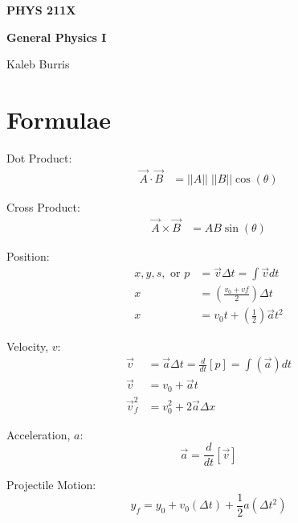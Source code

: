 \documentclass[10pt, letterpaper]{book}
\begin{document}
    \begin{titlepage}
        \Huge \textbf{PHYS 211X}

        \huge \textbf{General Physics I}

        \vfill

        \Large Kaleb Burris
    \end{titlepage}

    \section*{Formulae}

    \begin{multicols*}{2}

        Dot Product:
        \begin{align}
            \vec{A}\cdot\vec{B} & = ||A|| \; ||B||\cos(\theta)
        \end{align}

        Cross Product:
        \begin{align}
            \vec{A}\times\vec{B} & = AB\sin(\theta)
        \end{align}

        Position:
        \begin{align}
            x, y, s, \text{ or } p  & = \vec{v}\Delta t = \int\vec{v}dt                     \\
                                 x  & = \left(\frac{v_{0}+v{f}}{2}\right)\Delta t           \\
                                 x  & = v_{0} t+\left(\frac{1}{2}\right)\vec{a} t^{2}       
        \end{align}

        Velocity, $v$:
        \begin{align}
            \vec{v}         & = \vec{a}\Delta t = \frac{d}{dt}[p] = \int(\vec{a})dt     \\
            \vec{v}         & = v_{0} + \vec{a}t                                        \\
            \vec{v}^{2}_{f} & = v^{2}_{0} + 2\vec{a}\Delta x                            
        \end{align}

        Acceleration, $a$:
        \begin{equation}
            \vec{a} = \frac{d}{dt}[\vec{v}]
        \end{equation}

        Projectile Motion:
        \begin{equation}
            \label{eqn::yfinal}
            y_{f} = y_{0} + v_{0}(\Delta t) + \frac{1}{2}a(\Delta t^{2})
        \end{equation}


\end{multicols*}
\end{document}
